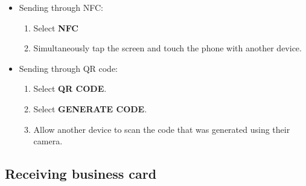 \documentclass[english]{article}
\begin{document}
\begin{itemize}
		\item Sending through NFC:
		\begin{enumerate}
			\item Select \textbf{NFC}
			\item Simultaneously tap the screen and touch the phone with another device.
		\end{enumerate}

		\item Sending through QR code:
		\begin{enumerate}
			\item Select \textbf{QR CODE}.
			\item Select \textbf{GENERATE CODE}.
			\item Allow another device to scan the code that was generated using their camera.
		\end{enumerate}
	\end{itemize}


\subsection{Receiving business card}
	
\end{document}
